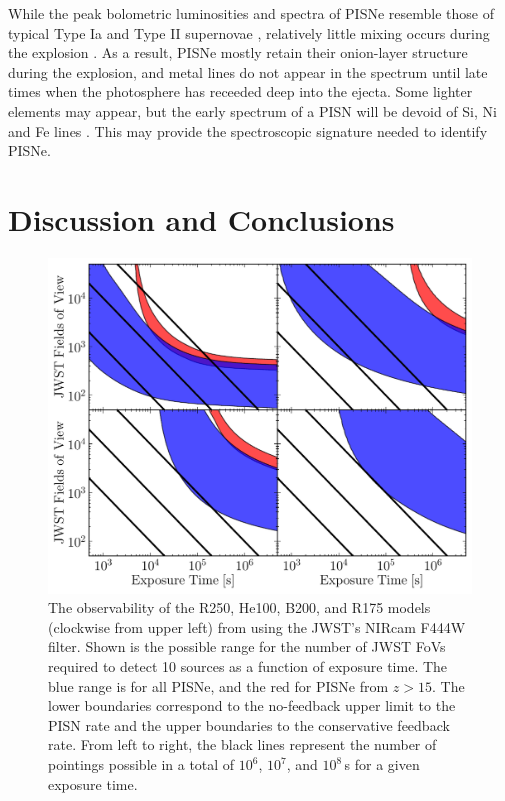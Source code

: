 \documentclass{thesis}
\begin{document}
While the peak bolometric luminosities and spectra of PISNe resemble
those of typical Type Ia and Type II supernovae
\citep{JoggerstWhalen2011, KasenWoosleyHeger2011}, relatively little
mixing occurs during the explosion \citep{JoggerstWhalen2011,
  ChenHegerAlmgren2011}.  As a result, PISNe mostly retain their
onion-layer structure during the explosion, and metal lines do not
appear in the spectrum until late times when the photosphere has
receeded deep into the ejecta.  Some lighter elements may appear, but
the early spectrum of a PISN will be devoid of Si, Ni and Fe lines
\citep{JoggerstWhalen2011}. This may provide the spectroscopic
signature needed to identify PISNe.

\section{Discussion and Conclusions}
\label{conclusions} 
\begin{figure}
\begin{center}
  \includegraphics[width=\columnwidth]{observability}
  \caption{The observability of the R250, He100, B200,
    and R175 models (clockwise from upper left) from
    \citet{KasenWoosleyHeger2011} using the JWST's NIRcam F444W
    filter. Shown is the possible range for the number of JWST FoVs
    required to detect 10 sources as a function of exposure time. The
    blue range is for all PISNe, and the red for PISNe
    from $z>15$.  The lower boundaries correspond to the
    no-feedback upper limit to the PISN rate and the upper boundaries to
    the conservative feedback rate.  From left to right, the black
    lines represent the number of pointings possible in a total of
    $10^6$, $10^7$, and $10^8\,$s for a given exposure time.}
  \label{observability}
\end{center}
\end{figure}
\end{document}

